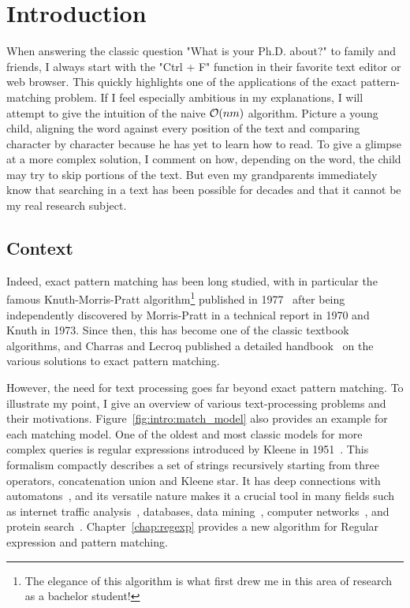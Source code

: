 \chapter*{Introduction}\label{chap:intro}

When answering the classic question "What is your Ph.D. about?" to family and friends, I always start with the "Ctrl + F" function in their favorite text editor or web browser. This quickly highlights one of the applications of the exact pattern-matching problem. If I feel especially ambitious in my explanations, I will attempt to give the intuition of the naive $\mathcal{O}(nm)$ algorithm. Picture a young child, aligning the word against every position of the text and comparing character by character because he has yet to learn how to read. To give a glimpse at a more complex solution, I comment on how, depending on the word, the child may try to skip portions of the text. But even my grandparents immediately know that searching in a text has been possible for decades and that it cannot be my real research subject.

\section{Context} 

Indeed, exact pattern matching has been long studied, with in particular the famous Knuth-Morris-Pratt algorithm\footnote{The elegance of this algorithm is what first drew me in this area of research as a bachelor student!} published in 1977~\cite{KMP} after being independently discovered by Morris-Pratt in a technical report in 1970 and Knuth in 1973. Since then, this has become one of the classic textbook algorithms, and Charras and Lecroq published a detailed handbook~\cite{charras2004handbook} on the various solutions to exact pattern matching.



However, the need for text processing goes far beyond exact pattern matching. To illustrate my point, I give an overview of various text-processing problems and their motivations. Figure~\ref{fig:intro:match_model} also provides an example for each matching model.
One of the oldest and most classic models for more complex queries is regular expressions introduced by Kleene in 1951~\cite{RM-704}.
This formalism compactly describes a set of strings recursively starting from three operators, concatenation union and Kleene star.
It has deep connections with automatons~\cite{Thompson_automaton}, and its versatile nature makes it a crucial tool in many fields such as internet traffic analysis~\cite{4221791,4579527}, databases, data mining~\cite{1000341,10.5555/645927.672035,10.1145/375551.375569}, computer networks~\cite{10.1145/1159913.1159952}, and protein search~\cite{10.1145/369133.369220}. Chapter~\ref{chap:regexp} provides a new algorithm for Regular expression and pattern matching.

